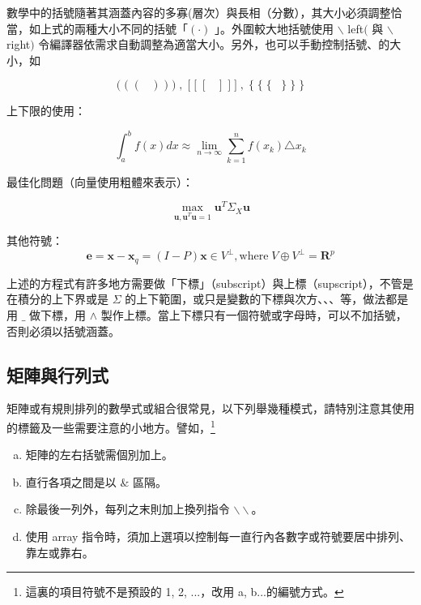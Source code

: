數學中的括號隨著其涵蓋內容的多寡(層次）與長相（分數），其大小必須調整恰當，如上式的兩種大小不同的括號「$( \cdot)$ 」。外圍較大地括號使用 $\backslash$  left$($ 與 $\backslash$  right$)$ 令編譯器依需求自動調整為適當大小。另外，也可以手動控制括號、的大小，如

 $$ \bigg(\; \big( \;(\;\;\;) \;\big) \;\bigg) \;,\; \bigg[ \;\big[ \;[\;\;\;]\; \big]\; \bigg]\;,\; \bigg\{ \;\big\{ \;\{\;\;\;\} \;\big\} \;\bigg\}$$ 
  
  
  上下限的使用：
  
  $$\int_a^b f(x) dx \approx \lim_{n\rightarrow \infty}\sum_{k=1}^n f(x_k)\triangle x_k$$
  
  最佳化問題（向量使用粗體來表示）：
  
  $$\max_{\mathbf{u},\mathbf{u}^T\mathbf{u}=1} \mathbf{u}^T\Sigma_X\mathbf{u}$$
  
  其他符號：
  $$\mathbf{e}=\mathbf{x}-\mathbf{x}_q=(I-P)\mathbf{x} \in V^{\perp}, \mbox{where}\; V\oplus V^{\perp}=\mathbf{R}^p $$

 上述的方程式有許多地方需要做「下標」（subscript）與上標（supscript），不管是在積分的上下界或是 $\Sigma$ 的上下範圍，或只是變數的下標與次方、、、等，做法都是用  $\_$ 做下標，用 $\wedge$ 製作上標。當上下標只有一個符號或字母時，可以不加括號，否則必須以括號涵蓋。
 
\subsection{矩陣與行列式}
矩陣或有規則排列的數學式或組合很常見，以下列舉幾種模式，請特別注意其使用的標籤及一些需要注意的小地方。譬如，\footnote{這裏的項目符號不是預設的 1, 2, ...，改用 a, b...的編號方式。}
\begin{enumerate}[a)]
  \item 矩陣的左右括號需個別加上。
  \item 直行各項之間是以 $\&$ 區隔。
  \item 除最後一列外，每列之末則加上換列指令 $\backslash\backslash$。
  \item 使用 {\A array} 指令時，須加上選項以控制每一直行內各數字或符號要居中排列、靠左或靠右。
\end{enumerate}

